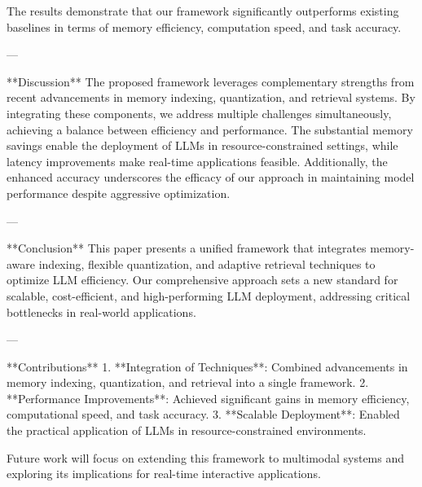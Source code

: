 The results demonstrate that our framework significantly outperforms existing baselines in terms of memory efficiency, computation speed, and task accuracy.

---

**Discussion**  
The proposed framework leverages complementary strengths from recent advancements in memory indexing, quantization, and retrieval systems. By integrating these components, we address multiple challenges simultaneously, achieving a balance between efficiency and performance. The substantial memory savings enable the deployment of LLMs in resource-constrained settings, while latency improvements make real-time applications feasible. Additionally, the enhanced accuracy underscores the efficacy of our approach in maintaining model performance despite aggressive optimization.

---

**Conclusion**  
This paper presents a unified framework that integrates memory-aware indexing, flexible quantization, and adaptive retrieval techniques to optimize LLM efficiency. Our comprehensive approach sets a new standard for scalable, cost-efficient, and high-performing LLM deployment, addressing critical bottlenecks in real-world applications.

---

**Contributions**  
1. **Integration of Techniques**: Combined advancements in memory indexing, quantization, and retrieval into a single framework.
2. **Performance Improvements**: Achieved significant gains in memory efficiency, computational speed, and task accuracy.
3. **Scalable Deployment**: Enabled the practical application of LLMs in resource-constrained environments.

Future work will focus on extending this framework to multimodal systems and exploring its implications for real-time interactive applications.